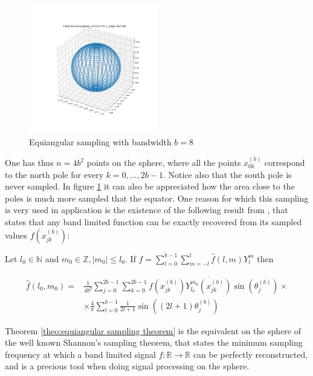 \begin{figure}[h]
	\centering
	\includegraphics[width=0.5\textwidth]{../codes/02.HeatKernelGraphLaplacian/equiangular/equiangular.png}
	\caption{\label{fig:equiangular sampling}Equiangular sampling with bandwidth $b=8$}
\end{figure}
One has thus $n=4b^2$ points on the sphere, where all the points $x_{0 k}^{(b)}$ correspond to the north pole for every $k=0, ..., 2b-1$. Notice also that the south pole is never sampled. In figure \ref{fig:equiangular sampling} it can also be appreciated how the area close to the poles is much more sampled that the equator. One reason for which this sampling is very used in application is the existence of the following result from \cite{Driscoll:1994:CFT:184069.184073}, that states that any band limited function can be exactly recovered from its sampled values $f\left(x_{j k}^{(b)}\right)$:
\vspace{0.5cm}
\begin{theorem}\label{theo:equiangular sampling theorem}
	Let \(l_{0} \in \mathbb{N}\) and \(m_{0} \in \mathbb{Z},\left|m_{0}\right| \leq l_{0} .\) If \(f=\sum_{l=0}^{b-1} \sum_{m=-l}^{l} \widehat{f}(l, m) Y_{l}^{m}\)
	then
	
	$$
	\begin{aligned} \widehat{f}\left(l_{0}, m_{0}\right)=& \frac{1}{4 b^{2}} \sum_{j=0}^{2 b-1} \sum_{k=0}^{2 b-1} f\left(x_{j k}^{(b)}\right) \overline{Y_{l_{0}}^{m_{0}}\left(x_{j k}^{(b)}\right)} \sin \left(\theta_{j}^{(b)}\right) \times \\ & \times \frac{4}{\pi} \sum_{l=0}^{b-1} \frac{1}{2 l+1} \sin \left((2 l+1) \theta_{j}^{(b)}\right) \end{aligned}
	$$
\end{theorem}
\vspace{0.5cm}
Theorem \ref{theo:equiangular sampling theorem} is the equivalent on the sphere of the well known Shannon's sampling theorem, that states the minimum sampling frequency at which a band limited signal $f:\mathbb R \to \mathbb R$ can be perfectly reconstructed, and is a precious tool when doing signal processing on the sphere.
